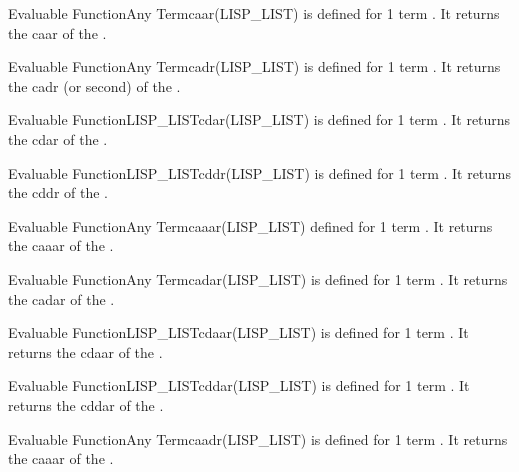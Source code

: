 \begin{typeefa}{Evaluable Function}{Any Term}{caar}{(LISP\_LIST)}
is defined for 1 term . It returns the caar  of the
.
\end{typeefa}

\begin{typeefa}{Evaluable Function}{Any Term}{cadr}{(LISP\_LIST)}
is defined for 1 term . It returns the cadr (or second) 
of the .
\end{typeefa}

\begin{typeefa}{Evaluable Function}{LISP\_LIST}{cdar}{(LISP\_LIST)}
is defined for 1 term . It returns the cdar  of the
.
\end{typeefa}

\begin{typeefa}{Evaluable Function}{LISP\_LIST}{cddr}{(LISP\_LIST)}
is defined for 1 term . It returns the cddr  of the
.
\end{typeefa}

\begin{typeefa}{Evaluable Function}{Any Term}{caaar}{(LISP\_LIST)}
defined for 1 term . It returns the caaar  of the
.
\end{typeefa}

\begin{typeefa}{Evaluable Function}{Any Term}{cadar}{(LISP\_LIST)}
is defined for 1 term . It returns the cadar  of the
.
\end{typeefa}

\begin{typeefa}{Evaluable Function}{LISP\_LIST}{cdaar}{(LISP\_LIST)}
is defined for 1 term . It returns the cdaar   of the
.
\end{typeefa}

\begin{typeefa}{Evaluable Function}{LISP\_LIST}{cddar}{(LISP\_LIST)}
is defined for 1 term . It returns the cddar  of the
.
\end{typeefa}

\begin{typeefa}{Evaluable Function}{Any Term}{caadr}{(LISP\_LIST)}
is defined for 1 term . It returns the caaar  of the
.
\end{typeefa}

